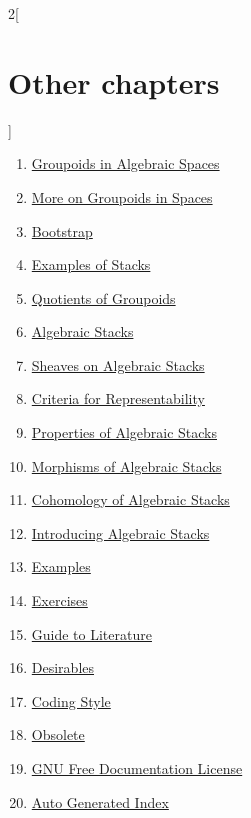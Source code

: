 \begin{multicols}{2}[\section{Other chapters}]
\begin{enumerate}
\item \hyperref[spaces-groupoids-section-phantom]{Groupoids in Algebraic Spaces}
\item \hyperref[spaces-more-groupoids-section-phantom]{More on Groupoids in Spaces}
\item \hyperref[bootstrap-section-phantom]{Bootstrap}
\item \hyperref[examples-stacks-section-phantom]{Examples of Stacks}
\item \hyperref[groupoids-quotients-section-phantom]{Quotients of Groupoids}
\item \hyperref[algebraic-section-phantom]{Algebraic Stacks}
\item \hyperref[stacks-sheaves-section-phantom]{Sheaves on Algebraic Stacks}
\item \hyperref[criteria-section-phantom]{Criteria for Representability}
\item \hyperref[stacks-properties-section-phantom]{Properties of Algebraic Stacks}
\item \hyperref[stacks-morphisms-section-phantom]{Morphisms of Algebraic Stacks}
\item \hyperref[stacks-cohomology-section-phantom]{Cohomology of Algebraic Stacks}
\item \hyperref[stacks-introduction-section-phantom]{Introducing Algebraic Stacks}
\item \hyperref[examples-section-phantom]{Examples}
\item \hyperref[exercises-section-phantom]{Exercises}
\item \hyperref[guide-section-phantom]{Guide to Literature}
\item \hyperref[desirables-section-phantom]{Desirables}
\item \hyperref[coding-section-phantom]{Coding Style}
\item \hyperref[obsolete-section-phantom]{Obsolete}
\item \hyperref[fdl-section-phantom]{GNU Free Documentation License}
\item \hyperref[index-section-phantom]{Auto Generated Index}
\end{enumerate}
\end{multicols}
